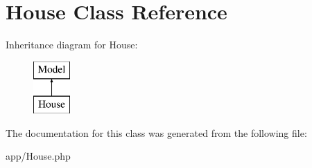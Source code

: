 \hypertarget{class_app_1_1_house}{}\section{House Class Reference}
\label{class_app_1_1_house}
Inheritance diagram for House\+:\begin{figure}[H]
\begin{center}
\leavevmode
\includegraphics[height=2.000000cm]{class_app_1_1_house}
\end{center}
\end{figure}


The documentation for this class was generated from the following file\+:\begin{DoxyCompactItemize}
\item 
app/House.\+php\end{DoxyCompactItemize}
